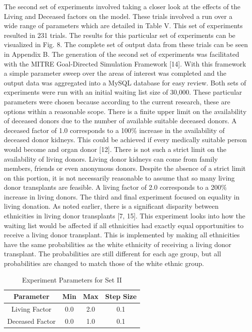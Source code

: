 \documentclass[9pt,a4paper,twocolumn]{scrartcl}
\begin{document}
The second set of experiments involved taking a closer look at the effects of the Living and Deceased factors on the model.  These trials involved a run over a wide range of parameters which are detailed in Table V.  This set of experiments resulted in 231 trials.  The results for this particular set of experiments can be visualized in Fig. 8.  The complete set of output data from these trials can be seen in Appendix B.  The generation of the second set of experiments was facilitated with the MITRE Goal-Directed Simulation Framework [14].  With this framework a simple parameter sweep over the areas of interest was completed and the output data was aggregated into a MySQL database for easy review.  Both sets of experiments were run with an initial waiting list size of 30,000.
These particular parameters were chosen because according to the current research, these are options within a reasonable scope.  There is a finite upper limit on the availability of deceased donors due to the number of available suitable deceased donors.  A deceased factor of 1.0 corresponds to a 100\% increase in the availability of deceased donor kidneys.  This could be achieved if every medically suitable person  would become and organ donor [12].  There is not such a strict limit on the availability of living donors.  Living donor kidneys can come from family members, friends or even anonymous donors.  Despite the absence of a strict limit on this portion, it is not necessarily reasonable to assume that so many living donor transplants are feasible.  A living factor of 2.0 corresponds to a 200\% increase in living donors.
The third and final experiment focused on equality in living donation.  As noted earlier, there is a significant disparity between ethnicities in living donor transplants [7, 15].  This experiment looks into how the waiting list would be affected if all ethnicities had exactly equal opportunities to receive a living donor transplant.  This is implemented by making all ethnicities have the same probabilities as the white ethnicity of receiving a living donor transplant.  The probabilities are still different for each age group, but all probabilities are changed to match those of the white ethnic group.

\begin{table}[ht] 
\caption{Experiment Parameters for Set II} %
\centering %
\begin{tabular}{c c c c} %
\hline\hline %
Parameter & Min & Max & Step Size\\ [0.5ex] %
\hline %
Living Factor & 0.0 & 2.0 & 0.1 \\ 
Deceased Factor & 0.0 & 1.0 & 0.1  \\ [1ex]
\hline %
\end{tabular} 
\label{table:experiment2} %
\end{table}
\end{document}
